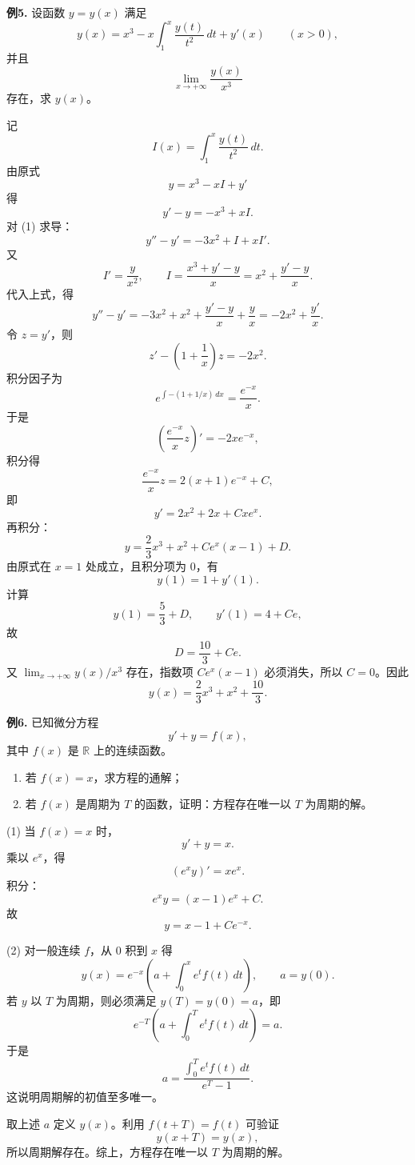 \begin{problemblock}
\textbf{例5.} 设函数 \(y=y(x)\) 满足
\[
y(x)=x^3-x\int_1^x\frac{y(t)}{t^2}\,dt+y'(x)\qquad (x>0),
\]
并且
\[
\lim_{x\to+\infty}\frac{y(x)}{x^3}
\]
存在，求 \(y(x)\)。
\end{problemblock}
\begin{solutionblock}
记
\[
I(x)=\int_1^x\frac{y(t)}{t^2}\,dt.
\]
由原式
\[
y=x^3-xI+y'
\]
得
\[
y'-y=-x^3+xI. \tag{1}
\]
对 (1) 求导：
\[
y''-y'=-3x^2+I+xI'.
\]
又
\[
I'=\frac{y}{x^2},\qquad
I=\frac{x^3+y'-y}{x}=x^2+\frac{y'-y}{x}.
\]
代入上式，得
\[
y''-y'=-3x^2+x^2+\frac{y'-y}{x}+\frac{y}{x}
=-2x^2+\frac{y'}x.
\]
令 \(z=y'\)，则
\[
z'-\left(1+\frac1x\right)z=-2x^2.
\]
积分因子为
\[
e^{\int-(1+1/x)\,dx}=\frac{e^{-x}}x.
\]
于是
\[
\left(\frac{e^{-x}}x z\right)'=-2xe^{-x},
\]
积分得
\[
\frac{e^{-x}}x z=2(x+1)e^{-x}+C,
\]
即
\[
y'=2x^2+2x+Cxe^x.
\]
再积分：
\[
y=\frac23x^3+x^2+Ce^x(x-1)+D.
\]
由原式在 \(x=1\) 处成立，且积分项为 \(0\)，有
\[
y(1)=1+y'(1).
\]
计算
\[
y(1)=\frac53+D,\qquad y'(1)=4+Ce,
\]
故
\[
D=\frac{10}{3}+Ce.
\]
又 \(\lim_{x\to+\infty}y(x)/x^3\) 存在，指数项 \(Ce^x(x-1)\) 必须消失，所以 \(C=0\)。因此
\[
y(x)=\frac23x^3+x^2+\frac{10}{3}.
\]
\end{solutionblock}

\begin{problemblock}
\textbf{例6.} 已知微分方程
\[
y'+y=f(x),
\]
其中 \(f(x)\) 是 \(\mathbb R\) 上的连续函数。

\begin{enumerate}[label=(\arabic*)]
\item 若 \(f(x)=x\)，求方程的通解；
\item 若 \(f(x)\) 是周期为 \(T\) 的函数，证明：方程存在唯一以 \(T\) 为周期的解。
\end{enumerate}
\end{problemblock}
\begin{solutionblock}
(1) 当 \(f(x)=x\) 时，
\[
y'+y=x.
\]
乘以 \(e^x\)，得
\[
(e^xy)'=xe^x.
\]
积分：
\[
e^xy=(x-1)e^x+C.
\]
故
\[
y=x-1+Ce^{-x}.
\]

(2) 对一般连续 \(f\)，从 \(0\) 积到 \(x\) 得
\[
y(x)=e^{-x}\left(a+\int_0^x e^t f(t)\,dt\right),
\qquad a=y(0).
\]
若 \(y\) 以 \(T\) 为周期，则必须满足 \(y(T)=y(0)=a\)，即
\[
e^{-T}\left(a+\int_0^T e^t f(t)\,dt\right)=a.
\]
于是
\[
a=\frac{\int_0^T e^t f(t)\,dt}{e^T-1}.
\]
这说明周期解的初值至多唯一。

取上述 \(a\) 定义 \(y(x)\)。利用 \(f(t+T)=f(t)\) 可验证
\[
y(x+T)=y(x),
\]
所以周期解存在。综上，方程存在唯一以 \(T\) 为周期的解。
\end{solutionblock}

